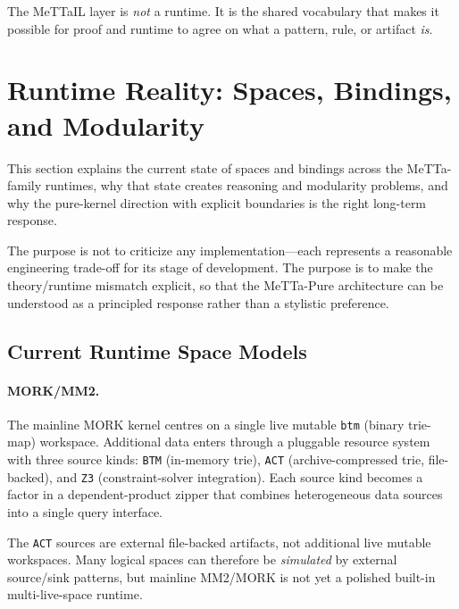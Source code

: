 \documentclass[11pt]{article}
\theoremstyle{remark}
\newcommand{\MeTTa}{\textup{MeTTa}}
\newcommand{\MeTTaIL}{\textup{MeTTaIL}}
\newcommand{\MORK}{\textup{MORK}}
\newcommand{\code}[1]{\texttt{#1}}
\begin{document}
\noindent
The \MeTTaIL{} layer is \emph{not} a runtime. It is the shared vocabulary
that makes it possible for proof and runtime to agree on what a pattern,
rule, or artifact \emph{is}.

\section{Runtime Reality: Spaces, Bindings, and Modularity}
\label{sec:runtime-reality}

This section explains the current state of spaces and bindings across the
\MeTTa-family runtimes, why that state creates reasoning and modularity
problems, and why the pure-kernel direction with explicit boundaries is
the right long-term response.

The purpose is not to criticize any implementation---each represents a
reasonable engineering trade-off for its stage of development.
The purpose is to make the theory/runtime mismatch explicit, so that the
\MeTTa-Pure architecture can be understood as a principled response rather
than a stylistic preference.

\subsection{Current Runtime Space Models}

\paragraph{\MORK{}/MM2.}
The mainline \MORK{} kernel
centres on a single live mutable \code{btm} (binary trie-map) workspace.
Additional data enters through a pluggable resource system with three
source kinds: \code{BTM} (in-memory trie), \code{ACT} (archive-compressed
trie, file-backed), and \code{Z3} (constraint-solver integration).  Each
source kind becomes a factor in a dependent-product zipper that combines
heterogeneous data sources into a single query interface.

The \code{ACT} sources are external file-backed artifacts, not additional
live mutable workspaces.  Many logical spaces can therefore be
\emph{simulated} by external source/sink patterns, but mainline MM2/\MORK{}
is not yet a polished built-in multi-live-space runtime.
\end{document}
